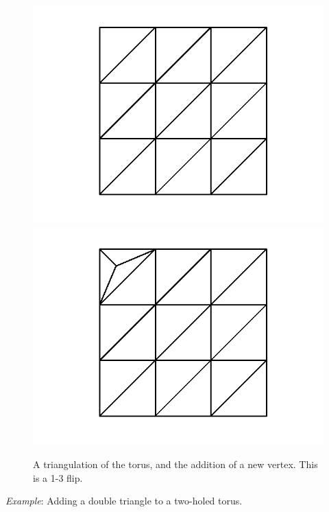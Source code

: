 \documentclass[12pt]{article}
\begin{document}
\begin{figure}[ht]
\includegraphics[scale = 0.5]{Pictures3/torus22.png}
\includegraphics[scale = 0.5]{Pictures3/torus2addvertex2.png}
\caption{A triangulation of the torus, and the addition of a new vertex. This is a 1-3 flip.}
\label{torusaddv}
\end{figure}

 \textit{Example}: Adding a double triangle to a two-holed torus.
\end{document}

